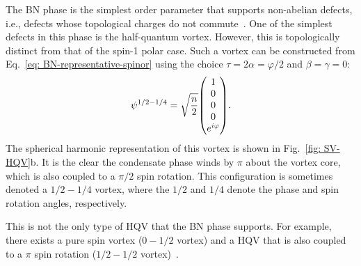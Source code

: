 The BN phase is the simplest order parameter that supports non-abelian defects,
i.e., defects whose topological charges do not commute~\cite{Mermin1979}.
One of the simplest defects in this phase is the half-quantum vortex.
However, this is topologically distinct from that of the spin-1 polar case.
Such a vortex can be constructed from Eq.~\eqref{eq: BN-representative-spinor}
using the choice \(\tau=2\alpha=\varphi/2\) and \(\beta=\gamma=0\):
\begin{equation}
    \psi^\mathrm{1/2-1/4} = \sqrt{\frac{n}{2}}\mqty(
    1 \\
    0 \\
    0 \\
    0 \\
    e^{i\varphi}
    ).
\end{equation}
The spherical harmonic representation of this vortex is shown in
Fig.~\ref{fig: SV-HQV}b.
It is the clear the condensate phase winds by \(\pi \) about the vortex core,
which is also coupled to a \(\pi / 2\) spin rotation.
This configuration is sometimes denoted a \(1/2-1/4\) vortex, where the \(1/2\)
and \(1/4\) denote the phase and spin rotation angles, respectively.

This is not the only type of HQV that the BN phase supports.
For example, there exists a pure spin vortex (\(0 - 1/2\) vortex) and a HQV
that is also coupled to a \(\pi \) spin rotation
(\(1/2-1/2\) vortex)~\cite{Kawaguchi2012}.

